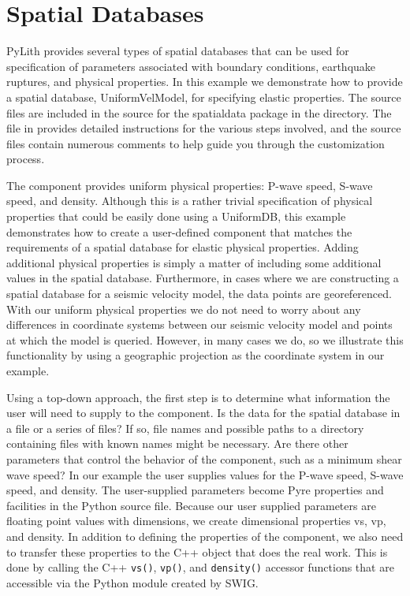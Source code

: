 \section{Spatial Databases}
\label{sec:extending:spatialdata:databases}

PyLith provides several types of spatial databases that can be used
for specification of parameters associated with boundary conditions,
earthquake ruptures, and physical properties. In this example we demonstrate
how to provide a spatial database, UniformVelModel, for specifying
elastic properties. The source files are included in the source for
the spatialdata package in the  directory.
The  file in  provides
detailed instructions for the various steps involved, and the source
files contain numerous comments to help guide you through the customization
process. 

The  component provides uniform physical
properties: P-wave speed, S-wave speed, and density. Although this is
a rather trivial specification of physical properties that could be
easily done using a UniformDB, this example demonstrates how to create
a user-defined component that matches the requirements of a spatial
database for elastic physical properties. Adding additional physical
properties is simply a matter of including some additional values in
the spatial database. Furthermore, in cases where we are constructing
a spatial database for a seismic velocity model, the data points are
georeferenced. With our uniform physical properties we do not need to
worry about any differences in coordinate systems between our seismic
velocity model and points at which the model is queried. However, in
many cases we do, so we illustrate this functionality by using a
geographic projection as the coordinate system in our example.

Using a top-down approach, the first step is to determine what
information the user will need to supply to the component. Is the data
for the spatial database in a file or a series of files? If so, file
names and possible paths to a directory containing files with known
names might be necessary. Are there other parameters that control the
behavior of the component, such as a minimum shear wave speed? In our
example the user supplies values for the P-wave speed, S-wave speed,
and density.  The user-supplied parameters become Pyre properties and
facilities in the Python source file. Because our user supplied
parameters are floating point values with dimensions, we create
dimensional properties vs, vp, and density. In addition to defining the properties of the
component, we also need to transfer these properties to the C++ object
that does the real work. This is done by calling the C++
\texttt{vs()}, \texttt{vp()}, and \texttt{density()} accessor
functions that are accessible via the Python module created by SWIG.

